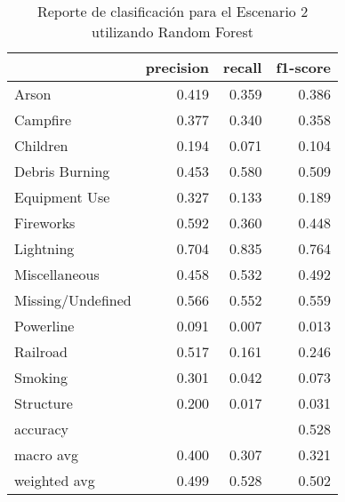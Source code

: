 \begin{table}
\centering
\caption{Reporte de clasificación para el Escenario 2 utilizando Random Forest}
\label{tab:RF_Escenario 2}
\begin{tabular}{lrrr}
\toprule
{} &  precision &  recall &  f1-score \\
\midrule
Arson             &      0.419 &   0.359 &     0.386 \\
Campfire          &      0.377 &   0.340 &     0.358 \\
Children          &      0.194 &   0.071 &     0.104 \\
Debris Burning    &      0.453 &   0.580 &     0.509 \\
Equipment Use     &      0.327 &   0.133 &     0.189 \\
Fireworks         &      0.592 &   0.360 &     0.448 \\
Lightning         &      0.704 &   0.835 &     0.764 \\
Miscellaneous     &      0.458 &   0.532 &     0.492 \\
Missing/Undefined &      0.566 &   0.552 &     0.559 \\
Powerline         &      0.091 &   0.007 &     0.013 \\
Railroad          &      0.517 &   0.161 &     0.246 \\
Smoking           &      0.301 &   0.042 &     0.073 \\
Structure         &      0.200 &   0.017 &     0.031 \\
accuracy          &            &         &     0.528 \\
macro avg         &      0.400 &   0.307 &     0.321 \\
weighted avg      &      0.499 &   0.528 &     0.502 \\
\bottomrule
\end{tabular}
\end{table}
